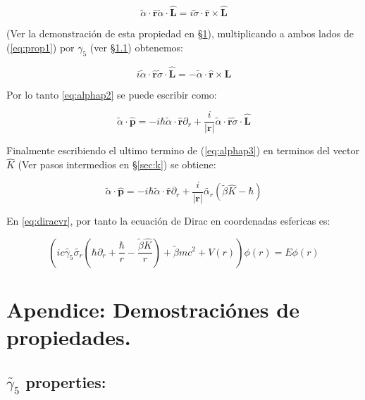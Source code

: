 \documentclass[a4paper, 12pt]{article} %
\begin{document}
\begin{equation}
\widetilde{\alpha}\cdot \hat{\mathbf{r}}\widetilde{\alpha}\cdot \hat{\mathbf{L}}
= i \widetilde{\sigma}\cdot \hat{\mathbf{r}}\times \hat{\mathbf{L}}
\end{equation}

(Ver la demonstraci\'on de esta propiedad en \S \ref{sec:apendice}), multiplicando a ambos lados de (\ref{eq:prop1}) por $\gamma_5$ (ver \S \ref{sec:gamma5}) 
obtenemos:   

\begin{equation}
i\widetilde{\alpha}\cdot\hat{\mathbf{r}}\widetilde{\sigma} \cdot \hat{\mathbf{L}} = -\widetilde{\alpha}\cdot \hat{\mathbf{r}} \times \mathbf{L}
\end{equation}

Por lo tanto \ref{eq:alphap2} se puede escribir como:

\begin{equation}\label{eq:alphap3}
\widetilde{\alpha}\cdot \mathbf{\hat{p}} = -i\hbar \widetilde{\alpha}\cdot \hat{\mathbf{r}}\partial_r + \dfrac{i}{|\mathbf{r}|}
\widetilde{\alpha}\cdot \hat{\mathbf{r}}\widetilde{\sigma}\cdot \hat{\mathbf{L}}
\end{equation} 

Finalmente escribiendo el ultimo termino de (\ref{eq:alphap3}) en terminos
del vector $\hat{K}$ (Ver pasos intermedios en \S \ref{sec:k}) se obtiene:

\begin{equation}\label{alphap4}
\widetilde{\alpha} \cdot \mathbf{\hat{p}} = -i\hbar \widetilde{\alpha}\cdot \hat{\mathbf{r}}\partial_r + \dfrac{i}{|\mathbf{r}|} \widetilde{\alpha_r}(\widetilde{\beta}\hat{K}-\hbar)
\end{equation}

En \ref{eq:diracvr}, por tanto la ecuaci\'on de Dirac en coordenadas esfericas
es:

\begin{equation}
\left (ic\widetilde{\gamma_5}\widetilde{\sigma_r} \left (\hbar \partial_r + \dfrac{\hbar}{r} -  \dfrac{\widetilde{\beta}\hat{K}}{r}\right )  + \widetilde{\beta} m c^2 + V(r) \right ) \phi(r) = E \phi (r)
\end{equation}


\section{Apendice: Demostraci\'ones de propiedades.}\label{sec:apendice}

\subsection{$\widetilde{\gamma_5}$ properties:}\label{sec:gamma5}
\end{document}
